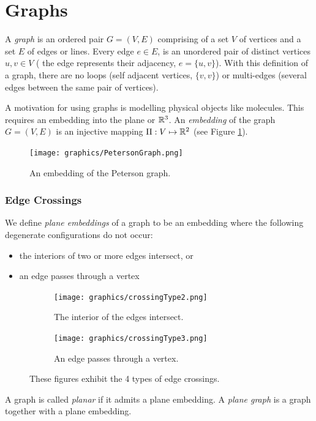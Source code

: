 \section{Graphs}
A \textit{graph} is an 
ordered pair $G = (V,E)$ comprising of a set $V$ of vertices and a set $E$ of edges or 
lines.  Every edge $e \in E$, is an unordered pair of distinct vertices $u,v \in V$ (
the edge represents their adjacency, $e = \{ u,v\}$). With this definition of a graph, there 
are 
no loops (self adjacent vertices, $\{v,v\}$) or multi-edges (several edges between the same pair of 
vertices).

A motivation for using graphs is modelling physical objects like molecules.  This requires an 
embedding into the plane or ${\mathbb{R}}^3$.  An \textit{embedding} of the 
graph $G = (V,E)$ is an injective mapping $\Pi : V \mapsto {\mathbb{R}}^{2}$ (see Figure 
\ref{fig:graph1-1}). 

\begin{figure}[!htbp]
\begin{center}
\texttt{[image: graphics/PetersonGraph.png]}
\caption{An embedding of the Peterson graph.}\label{fig:graph1-1}
\end{center} 
\end{figure} 
\subsubsection{Edge Crossings}
We define \textit{plane embeddings} of a graph to be an embedding where the following degenerate 
configurations 
do not occur:
\begin{itemize}
\item[\rn{1}] the interiors of two or more edges intersect, or
\item[\rn{2}] an edge passes through a vertex
\end{itemize} 
\begin{figure}[H]
\begin{center}
  \begin{subfigure}[b]{0.49\textwidth}
	  \texttt{[image: graphics/crossingType2.png]}
	  \caption{The interior of the edges intersect.}
	  \label{fig:ch1-linkages-1-2}
  \end{subfigure}
  \begin{subfigure}[b]{0.49\textwidth}
	  \texttt{[image: graphics/crossingType3.png]}
	  \caption{An edge passes through a vertex.}
	  \label{fig:ch1-linkages-1-3}
  \end{subfigure}
\end{center} 
\caption{These figures exhibit the 4 types of edge crossings.}\label{fig:ch1-linkages-1}
\end{figure}
A graph is called \textit{planar} if it admits a plane embedding.  A \textit{plane graph} is a 
graph together with a plane embedding.
